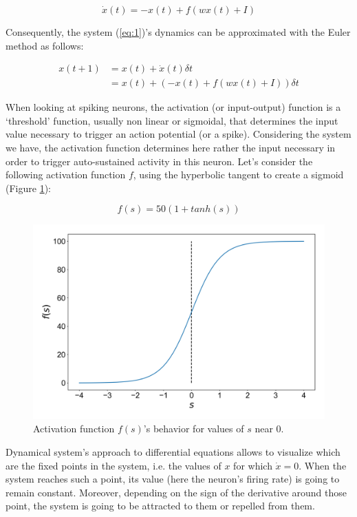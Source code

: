 \documentclass{article}
\begin{document}
\begin{equation}\label{eq:1}
  \dot{x}(t) = -x(t) + f(wx(t) +I)
\end{equation}

Consequently, the system (\ref{eq:1})'s dynamics can be approximated with the Euler method as follows:

\begin{align*}\label{eq:2}
  {x}(t+1) &= x(t) + \dot{x}(t)\delta t\\
            &= x(t) + (-x(t) + f(wx(t) +I))\delta t
\end{align*}

When looking at spiking neurons, the activation (or input-output) function is a `threshold' function, usually non linear or sigmoidal, that determines the input value necessary to trigger an action potential (or a spike). Considering the system we have, the activation function determines here rather the input necessary in order to trigger auto-sustained activity in this neuron. Let's consider the following activation function $f$, using the hyperbolic tangent to create a sigmoid (Figure \ref{fig:fig1}):

\begin{equation}
  f(s) = 50 (1 + tanh(s))
\end{equation}

\begin{figure}[H]
\centering
\includegraphics[width=.8\linewidth]{exercice5fig1.png}
\caption[spt]{Activation function $f(s)$'s behavior for values of $s$ near 0.}\label{fig:fig1}
\end{figure}

Dynamical system's approach to differential equations allows to visualize which are the fixed points in the system, i.e. the values of $x$ for which $\dot{x}=0$. When the system reaches such a point, its value (here the neuron's firing rate) is going to remain constant. Moreover, depending on the sign of the derivative around those point, the system is going to be attracted to them or repelled from them.\\
\end{document}
